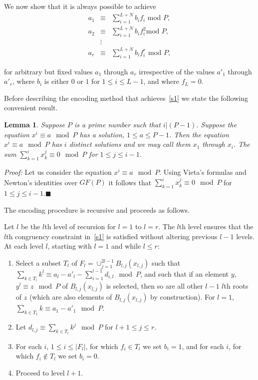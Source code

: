 \documentclass[12pt]{article} \pagestyle{plain} \topmargin
\newtheorem{lemma}{Lemma}
\begin{document}
 We now show that it is always possible to achieve
\begin{equation}\label{s1}\begin{array}{ccc} a_1 &\equiv& \sum_{i=1}^{L+N} b_i f_i
\text{ mod } P, \\ a_2 &\equiv& \sum_{i=1}^{L+N} b_i f_i^2 \text{
mod } P,\\ &\vdots& \\
a_r &\equiv& \sum_{i=1}^{L+N} b_i f_i^r \text{ mod }
P,\end{array}\end{equation}

for arbitrary but fixed values $a_1$ through $a_r$ irrespective of
the values ${a'}_1$ through ${a'}_r$, where $b_i$ is either $0$ or
$1$ for $1 \leq i \leq L-1$, and where $f_L=0$.

Before describing the encoding method that achieves~\eqref{s1} we
state the following convenient result.

\begin{lemma}\label{sums} Suppose $P$ is a prime number such that $i|(P-1)$. Suppose the
equation $x^i\equiv a \mod P$ has a solution, $1 \leq a \leq P-1$.
Then the equation $x^i\equiv a \mod P$ has $i$ distinct solutions
\cite{apostol} and we may call them $x_1$ through $x_i$. The sum
$\sum_{k=1}^i x_k^j \equiv 0 \mod P$ for $1 \leq j \leq i-1$.
\end{lemma}
\noindent \textit{Proof:} Let us consider the equation $x^i \equiv
a \mod P$. Using Vieta's formulas and Newton's identities over
$GF(P)$ it follows that
 $\sum_{k=1}^i x_k^j \equiv 0 \mod P$ for $1 \leq j \leq
i-1$.\hfill$\blacksquare$

The encoding procedure is recursive and proceeds as follows.

Let $l$ be the $l$th level of recursion for $l=1$ to $l=r$. The
$l$th level ensures that the $l$th congruency constraint
in~\eqref{s1} is satisfied without altering previous $l-1$ levels.
 At each level $l$, starting with $l=1$ and while $l \leq r$:
\begin{enumerate}
 \item Select a subset $T_{l}$ of $F_l=\cup_{j=1}^{2l-1} B_{l,j}(x_{l,j})$ such that $\sum_{k \in T_l} k^l \equiv a_l - {a'}_l -
\sum_{i=1}^{l-1} d_{i,l} \mod P$, and such that if an element $y$,
$y^l \equiv z \mod P$ of $B_{l,j}(x_{l,j})$ is selected, then so are
all other $l-1$ $l$th roots of $z$ (which are also elements of
$B_{l,j}(x_{l,j})$ by construction). For $l=1$, $\sum_{k \in T_1} k
\equiv a_1 - {a'}_1 \mod P$.\item Let $d_{l,j} \equiv \sum_{k \in
T_l} k^j \mod P$ for $l+1 \leq j\leq r$.
\item For each $i$, $1 \leq i \leq |F_l|$, for which $f_i \in T_l$
we set $b_i=1$, and for each $i$, for which $f_i \notin T_l$ we set
$b_i=0$. \item Proceed to level $l+1$.
\end{enumerate}
\end{document}

